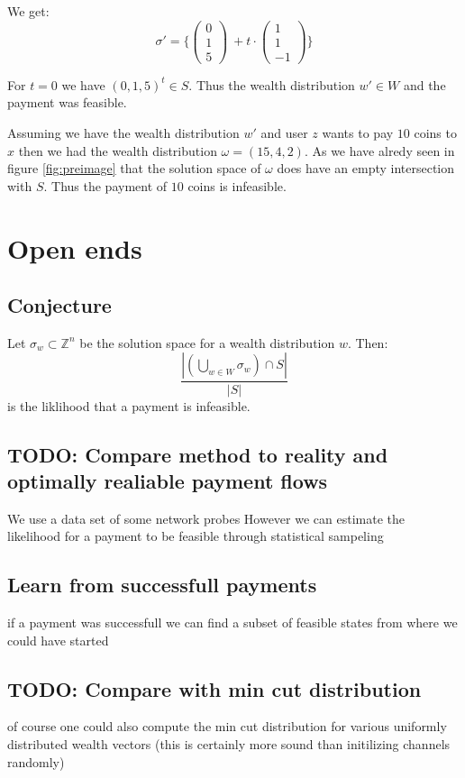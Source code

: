 \documentclass[10pt,twocolumn]{article}
\begin{document}
  We get:
\[\sigma' = \{\begin{pmatrix}0\\1\\5\end{pmatrix}\ + t\cdot \begin{pmatrix}1\\1\\-1\end{pmatrix}\}\]

  For $t=0$ we have $(0,1,5)^t\in S$.
  Thus the wealth distribution $w'\in W$ and the payment was feasible.

  Assuming we have the wealth distribution $w'$ and user $z$ wants to pay $10$ coins to $x$ then we had the wealth distribution $\omega=(15,4,2)$.
  As we have alredy seen in figure \ref{fig:preimage} that the solution space of $\omega$ does have an empty intersection with $S$.
  Thus the payment of $10$ coins is infeasible. 


\section{Open ends}
  \subsection{Conjecture}
  Let $\sigma_w\subset \mathbb{Z}^n$ be the solution space for a wealth distribution $w$.
  Then:
  \begin{equation}
    \frac{|\left(\bigcup_{w\in W}\sigma_w\right)\cap S|}{|S|}
  \end{equation}
  is the liklihood that a payment is infeasible.


  
\subsection{TODO: Compare method to reality and optimally realiable payment flows}
We use a data set of some network probes
However we can estimate the likelihood for a payment to be feasible through statistical sampeling

\subsection{Learn from successfull payments}
if a payment was successfull we can find a subset of feasible states from where we could have started

\subsection{TODO: Compare with min cut distribution}
of course one could also compute the min cut distribution for various uniformly distributed wealth vectors (this is certainly more sound than initilizing channels randomly)
\end{document}
